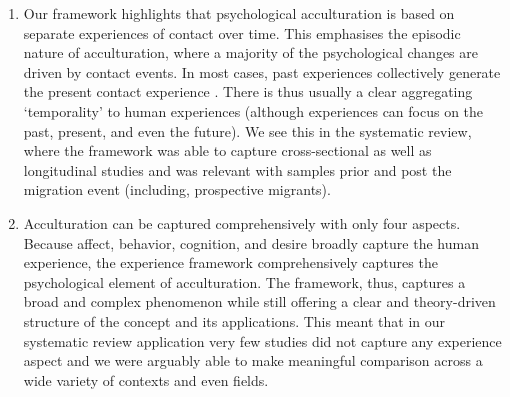 \documentclass[man, 12pt, a4paper, mask]{apa7}
\begin{document}
\begin{enumerate}
\item Our framework highlights that psychological acculturation is based on separate experiences of contact over time. This emphasises the episodic nature of acculturation, where a majority of the psychological changes are driven by contact events. In most cases, past experiences collectively generate the present contact experience \citep[also see][]{Husserl1959, Heidegger1867}. There is thus usually a clear aggregating `temporality' to human experiences (although experiences can focus on the past, present, and even the future). We see this in the systematic review, where the framework was able to capture cross-sectional as well as longitudinal studies and was relevant with samples prior and post the migration event (including, prospective migrants). 

\item Acculturation can be captured comprehensively with only four aspects. Because affect, behavior, cognition, and desire broadly capture the human experience, the experience framework comprehensively captures the psychological element of acculturation. The framework, thus, captures a broad and complex phenomenon while still offering a clear and theory-driven structure of the concept and its applications. This meant that in our systematic review application very few studies did not capture any experience aspect and we were arguably able to make meaningful comparison across a wide variety of contexts and even fields.


\end{enumerate}
\end{document}
